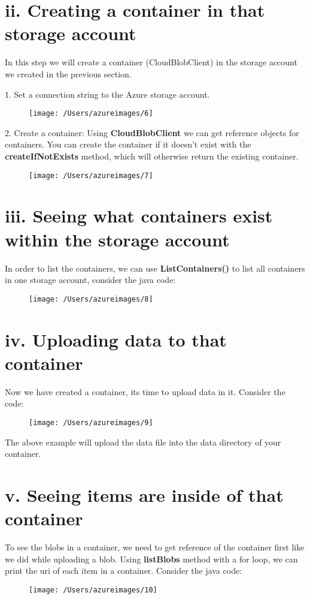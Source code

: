 \documentclass[12pt, letterpaper, twoside]{article}
\begin{document}
\section*{ii. Creating a container in that storage account}	
In this step we will create a container (CloudBlobClient) in the storage account we created in the previous section. \par
\vspace{0.5cm}
1. Set a connection string to the Azure storage account. 
\begin{figure}[H]
	\centering
	\texttt{[image: /Users/azureimages/6]}
\end{figure}
2. Create a container: Using \textbf{CloudBlobClient} we can get reference \indent objects for containers. You can create the container if it doesn't exist \indent with the \textbf{createIfNotExists} method, which will otherwise return the \indent existing container. 
\begin{figure}[H]
	\centering
	\texttt{[image: /Users/azureimages/7]}
\end{figure}
\clearpage

\section*{iii. Seeing what containers exist within the storage account}
In order to list the containers, we can use \textbf{ListContainers()} to list all containers in one storage account, consider the java code:
\begin{figure}[H]
	\centering
	\texttt{[image: /Users/azureimages/8]}
\end{figure}
	
	
\section*{iv. Uploading data to that container}	
Now we have created a container, its time to upload data in it. Consider the code:
\begin{figure}[H]
	\centering
	\texttt{[image: /Users/azureimages/9]}
\end{figure}
The above example will upload the data file into the data directory of \indent your container.

\section*{v. Seeing items are inside of that container}
To see the blobs in a container, we need to get reference of the container first like we did while uploading a blob. Using \textbf{listBlobs} method with a for loop, we can print the uri of each item in a container. Consider the java code:
\begin{figure}[H]
	\centering
	\texttt{[image: /Users/azureimages/10]}
\end{figure}
 		
\end{document}
